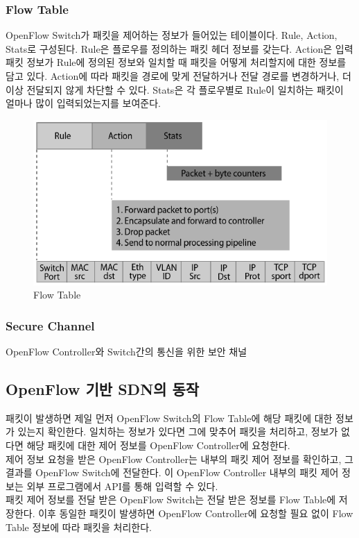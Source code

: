     \subsubsection*{Flow Table}
    OpenFlow Switch가 패킷을 제어하는 정보가 들어있는 테이블이다. Rule, Action, Stats로 구성된다. Rule은 플로우를 정의하는 패킷 헤더 정보를 갖는다. Action은 입력 패킷 정보가 Rule에 정의된 정보와 일치할 때 패킷을 어떻게 처리할지에 대한 정보를 담고 있다. Action에 따라 패킷을 경로에 맞게 전달하거나 전달 경로를 변경하거나, 더 이상 전달되지 않게 차단할 수 있다. Stats은 각 플로우별로 Rule이 일치하는 패킷이 얼마나 많이 입력되었는지를 보여준다. \\
    \vspace{-4mm}
    \begin{figure}[!h]\centering
		\includegraphics[width=.65\textwidth]{image/week05/2-2.png}
		\caption{\small Flow Table}
		\vspace{-10pt}
    \end{figure}
    
     \subsubsection*{Secure Channel}
     OpenFlow Controller와 Switch간의 통신을 위한 보안 채널 \\
     
\subsection{OpenFlow 기반 SDN의 동작}
    패킷이 발생하면 제일 먼저 OpenFlow Switch의 Flow Table에 해당 패킷에 대한 정보가 있는지 확인한다. 일치하는 정보가 있다면 그에 맞추어 패킷을 처리하고, 정보가 없다면 해당 패킷에 대한 제어 정보를 OpenFlow Controller에 요청한다. \\
    제어 정보 요청을 받은 OpenFlow Controller는 내부의 패킷 제어 정보를 확인하고, 그 결과를 OpenFlow Switch에 전달한다. 이 OpenFlow Controller 내부의 패킷 제어 정보는 외부 프로그램에서 API를 통해 입력할 수 있다. \\
    패킷 제어 정보를 전달 받은 OpenFlow Switch는 전달 받은 정보를 Flow Table에 저장한다. 이후 동일한 패킷이 발생하면 OpenFlow Controller에 요청할 필요 없이 Flow Table 정보에 따라 패킷을 처리한다. \\
\newpage